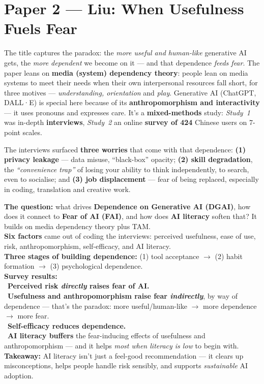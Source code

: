 \documentclass[11pt, oneside]{book}
\begin{document}
\section{Paper 2 — Liu: When Usefulness Fuels Fear}

The title captures the paradox: the \emph{more useful and human-like}
generative AI gets, the \emph{more dependent} we become on it — and that
dependence \emph{feeds fear}. The paper leans on \textbf{media (system)
dependency theory}: people lean on media systems to meet their needs when
their own interpersonal resources fall short, for three motives —
\emph{understanding, orientation} and \emph{play}. Generative AI (ChatGPT,
DALL·E) is special here because of its \textbf{anthropomorphism and
interactivity} — it uses pronouns and expresses care. It's a
\textbf{mixed-methods} study: \emph{Study~1} was in-depth \textbf{interviews},
\emph{Study~2} an online \textbf{survey of 424} Chinese users on 7-point
scales.

The interviews surfaced \textbf{three worries} that come with that dependence:
\textbf{(1) privacy leakage} — data misuse, ``black-box'' opacity;
\textbf{(2) skill degradation}, the \emph{``convenience trap''} of losing your
ability to think independently, to search, even to socialise; and \textbf{(3)
job displacement} — fear of being replaced, especially in coding, translation
and creative work.

\begin{thmbox}[title={Paper 2 — what you need to remember}]
\textbf{The question:} what drives \textbf{Dependence on Generative AI (DGAI)},
how does it connect to \textbf{Fear of AI (FAI)}, and how does \textbf{AI
literacy} soften that? It builds on media dependency theory plus TAM.\\
\textbf{Six factors} came out of coding the interviews: perceived usefulness,
ease of use, risk, anthropomorphism, self-efficacy, and AI literacy.\\
\textbf{Three stages of building dependence:} (1) tool acceptance $\to$
(2) habit formation $\to$ (3) psychological dependence.\\
\textbf{Survey results:}\\
\textbullet\ \textbf{Perceived risk \emph{directly} raises fear of AI.}\\
\textbullet\ \textbf{Usefulness and anthropomorphism raise fear
\emph{indirectly}}, by way of dependence — that's the paradox: more
useful/human-like $\to$ more dependence $\to$ more fear.\\
\textbullet\ \textbf{Self-efficacy reduces dependence.}\\
\textbullet\ \textbf{AI literacy buffers} the fear-inducing effects of
usefulness and anthropomorphism — and it helps \emph{most when literacy is
low} to begin with.\\
\textbf{Takeaway:} AI literacy isn't just a feel-good recommendation — it
clears up misconceptions, helps people handle risk sensibly, and supports
\emph{sustainable} AI adoption.
\end{thmbox}
\end{document}
